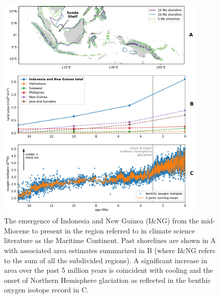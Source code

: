 \documentclass[11pt,letterpaper]{article}
\begin{document}
\begin{figure}[h!]
    \centering
    \includegraphics[width=0.9\textwidth]{Figures/shoreline_growth.pdf}
    \caption{The emergence of Indonesia and New Guinea (I\&NG) from the mid-Miocene to present in the region referred to in climate science literature as the Maritime Continent. Past shorelines are shown in A with associated area estimates summarized in B (where I\&NG refers to the sum of all the subdivided regions). A significant increase in area over the past 5 million years is coincident with cooling and the onset of Northern Hemisphere glaciation as reflected in the benthic oxygen isotope record \cite{Zachos2008a} in C.}
    \label{fig:shoreline_growth}
\end{figure}
\end{document}
